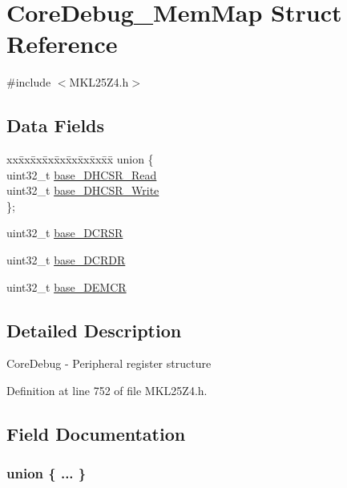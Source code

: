 \hypertarget{struct_core_debug___mem_map}{}\section{Core\+Debug\+\_\+\+Mem\+Map Struct Reference}
\label{struct_core_debug___mem_map}


{\ttfamily \#include $<$M\+K\+L25\+Z4.\+h$>$}

\subsection*{Data Fields}
\begin{DoxyCompactItemize}
\item 
\begin{tabbing}
xx\=xx\=xx\=xx\=xx\=xx\=xx\=xx\=xx\=\kill
union \{\\
\>uint32\_t \hyperlink{struct_core_debug___mem_map_a4968901505f61e2a98c9196a8ac7584b}{base\_DHCSR\_Read}\\
\>uint32\_t \hyperlink{struct_core_debug___mem_map_a57de52c8c1eb5789546543f2408ce487}{base\_DHCSR\_Write}\\
\}; \\

\end{tabbing}\item 
uint32\+\_\+t \hyperlink{struct_core_debug___mem_map_ad9c98f7390e5d3a6b54df56ddea32e8b}{base\+\_\+\+D\+C\+R\+SR}
\item 
uint32\+\_\+t \hyperlink{struct_core_debug___mem_map_aac76a717b2aba2ccbf75e020cc71fb3e}{base\+\_\+\+D\+C\+R\+DR}
\item 
uint32\+\_\+t \hyperlink{struct_core_debug___mem_map_a13a099e668fcb3587b2cd6eb8f8608d5}{base\+\_\+\+D\+E\+M\+CR}
\end{DoxyCompactItemize}


\subsection{Detailed Description}
Core\+Debug -\/ Peripheral register structure 

Definition at line 752 of file M\+K\+L25\+Z4.\+h.



\subsection{Field Documentation}
\subsubsection[{\texorpdfstring{"@1}{@1}}]{\setlength{\rightskip}{0pt plus 5cm}union \{ ... \} }\hypertarget{struct_core_debug___mem_map_a443ba91dcdfda2b633cfeb0741834a97}{}\label{struct_core_debug___mem_map_a443ba91dcdfda2b633cfeb0741834a97}
